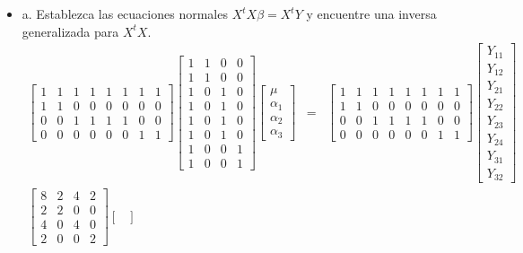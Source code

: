 \documentclass[12pt,a4paper]{report}
\begin{document}
\begin{itemize}
\item a. Establezca las ecuaciones normales $X^tX\beta =X^tY$ y encuentre una inversa generalizada para $X^tX$.
\begin{eqnarray*}
\begin{bmatrix}
1 & 1 & 1 & 1 & 1 & 1 & 1 & 1 \\
1 & 1 & 0 & 0 & 0 & 0 & 0 & 0 \\
0 & 0 & 1 & 1 & 1 & 1 & 0 & 0 \\
0 & 0 & 0 & 0 & 0 & 0 & 1 & 1
\end{bmatrix}\begin{bmatrix}
1 & 1 & 0 & 0 \\
1 & 1 & 0 & 0 \\
1 & 0 & 1 & 0 \\
1 & 0 & 1 & 0 \\
1 & 0 & 1 & 0 \\
1 & 0 & 1 & 0 \\
1 & 0 & 0 & 1 \\
1 & 0 & 0 & 1
\end{bmatrix}\begin{bmatrix}
\mu \\ \alpha_1 \\ \alpha_2 \\ \alpha_3
\end{bmatrix} &=& \begin{bmatrix}
1 & 1 & 1 & 1 & 1 & 1 & 1 & 1 \\
1 & 1 & 0 & 0 & 0 & 0 & 0 & 0 \\
0 & 0 & 1 & 1 & 1 & 1 & 0 & 0 \\
0 & 0 & 0 & 0 & 0 & 0 & 1 & 1
\end{bmatrix}\begin{bmatrix} Y_{11} \\ 
Y_{12} \\ Y_{21} \\ Y_{22} \\ Y_{23} \\ Y_{24} \\ Y_{31} \\ Y_{32}
\end{bmatrix}\\
\begin{bmatrix}
8 & 2 & 4 & 2 \\
2 & 2 & 0 & 0 \\
4 & 0 & 4 & 0 \\
2 & 0 & 0 & 2
\end{bmatrix}\begin{bmatrix}

\end{bmatrix}
\end{eqnarray*}
\end{itemize}
\end{document}
